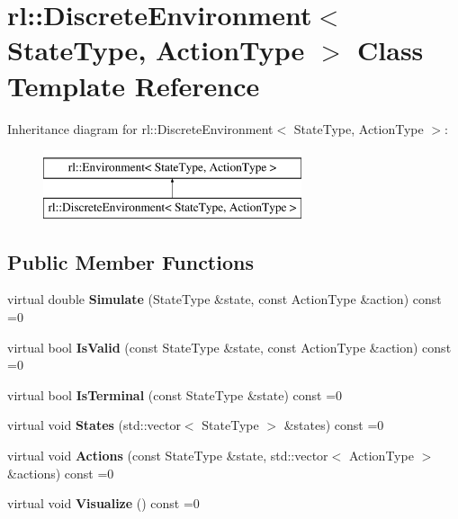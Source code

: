 \hypertarget{classrl_1_1_discrete_environment}{}\section{rl\+:\+:Discrete\+Environment$<$ State\+Type, Action\+Type $>$ Class Template Reference}
\label{classrl_1_1_discrete_environment}
Inheritance diagram for rl\+:\+:Discrete\+Environment$<$ State\+Type, Action\+Type $>$\+:\begin{figure}[H]
\begin{center}
\leavevmode
\includegraphics[height=2.000000cm]{classrl_1_1_discrete_environment}
\end{center}
\end{figure}
\subsection*{Public Member Functions}
\begin{DoxyCompactItemize}
\item 
\hypertarget{classrl_1_1_discrete_environment_a98f98b36d1a5148175e4307bba402f5e}{}\label{classrl_1_1_discrete_environment_a98f98b36d1a5148175e4307bba402f5e} 
virtual double {\bfseries Simulate} (State\+Type \&state, const Action\+Type \&action) const =0
\item 
\hypertarget{classrl_1_1_discrete_environment_a4e5f5e0425dc93dea82734b7327b22b8}{}\label{classrl_1_1_discrete_environment_a4e5f5e0425dc93dea82734b7327b22b8} 
virtual bool {\bfseries Is\+Valid} (const State\+Type \&state, const Action\+Type \&action) const =0
\item 
\hypertarget{classrl_1_1_discrete_environment_a7f41635b8c010b8a18a8661d0c2c0932}{}\label{classrl_1_1_discrete_environment_a7f41635b8c010b8a18a8661d0c2c0932} 
virtual bool {\bfseries Is\+Terminal} (const State\+Type \&state) const =0
\item 
\hypertarget{classrl_1_1_discrete_environment_a2cd36d24262dfc595574708f1118760f}{}\label{classrl_1_1_discrete_environment_a2cd36d24262dfc595574708f1118760f} 
virtual void {\bfseries States} (std\+::vector$<$ State\+Type $>$ \&states) const =0
\item 
\hypertarget{classrl_1_1_discrete_environment_a46561149e83e67db9e83d6d6169a9087}{}\label{classrl_1_1_discrete_environment_a46561149e83e67db9e83d6d6169a9087} 
virtual void {\bfseries Actions} (const State\+Type \&state, std\+::vector$<$ Action\+Type $>$ \&actions) const =0
\item 
\hypertarget{classrl_1_1_discrete_environment_ac9fc9c8f246e307509e6d041883ef89d}{}\label{classrl_1_1_discrete_environment_ac9fc9c8f246e307509e6d041883ef89d} 
virtual void {\bfseries Visualize} () const =0
\end{DoxyCompactItemize}


